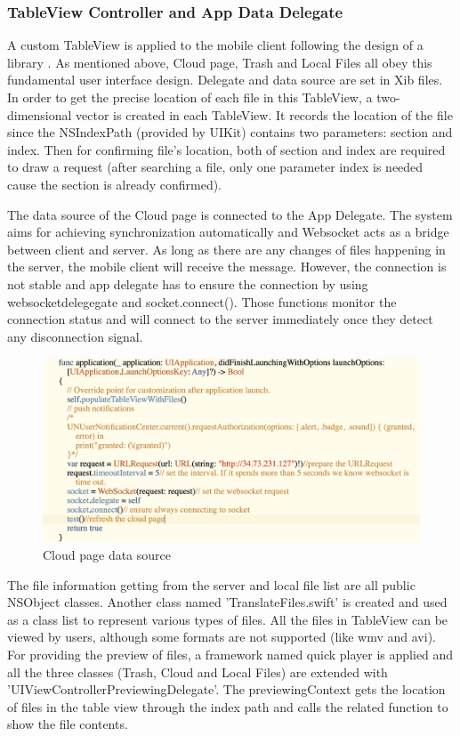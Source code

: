 \documentclass{article}
\begin{document}
\subsubsection{TableView Controller and App Data Delegate}
A custom TableView is applied to the mobile client following the design of a library \cite{c10}. As mentioned above, Cloud page, Trash and Local Files all obey this fundamental user interface design. Delegate and data source are set in Xib files. In order to get the precise location of each file in this TableView, a two-dimensional vector is created in each TableView. It records the location of the file since the NSIndexPath (provided by UIKit) contains two parameters: section and index. Then for confirming file's location, both of section and index are required to draw a request (after searching a file, only one parameter index is needed cause the section is already confirmed). 

The data source of the Cloud page is connected to the App Delegate. The system aims for achieving synchronization automatically and Websocket acts as a bridge between client and server. As long as there are any changes of files happening in the server, the mobile client will receive the message. However, the connection is not stable and app delegate has to ensure the connection by using websocketdelegegate and socket.connect(). Those functions monitor the connection status and will connect to the server immediately once they detect any disconnection signal. 

\begin{figure}[H]
\begin{center}
\includegraphics[width=12cm]{29.png}
\end{center}
\caption{Cloud page data source}\label{ex4}
\end{figure}

The file information getting from the server and local file list are all public NSObject classes. Another class named 'TranslateFiles.swift' is created and used as a class list to represent various types of files. All the files in TableView can be viewed by users, although some formats are not supported (like wmv and avi). For providing the preview of files, a framework named quick player is applied and all the three classes (Trash, Cloud and Local Files) are extended with 'UIViewControllerPreviewingDelegate'. The previewingContext gets the location of files in the table view through the index path and calls the related function to show the file contents.
\end{document}
